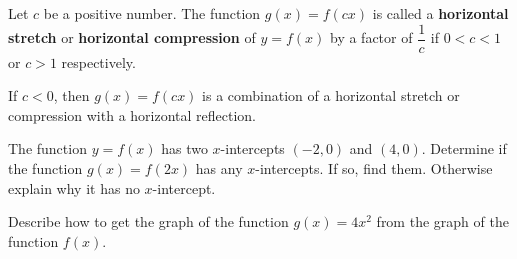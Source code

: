\begin{definition}
  Let $c$ be a positive number.
  The function $g(x)=f(cx)$ is called a \textbf{horizontal stretch} or \textbf{horizontal compression} of $y=f(x)$ by a factor of $\dfrac{1}{c}$ if $0<c<1$ or $c>1$ respectively.
\end{definition}
\begin{remark}
  If $c<0$, then $g(x)=f(cx)$ is a combination of a horizontal stretch or compression with a horizontal reflection.
\end{remark}
\begin{example}
  The function $y=f(x)$ has two $x$-intercepts $(-2, 0)$ and $(4, 0)$. Determine if the function $g(x)=f(2x)$ has any $x$-intercepts. If so, find them. Otherwise explain why it has no $x$-intercept.
\end{example}

\begin{example}
  Describe how to get the graph of the function $g(x)=4x^2$ from the graph of the function $f(x)$.
\end{example}
\newpage

